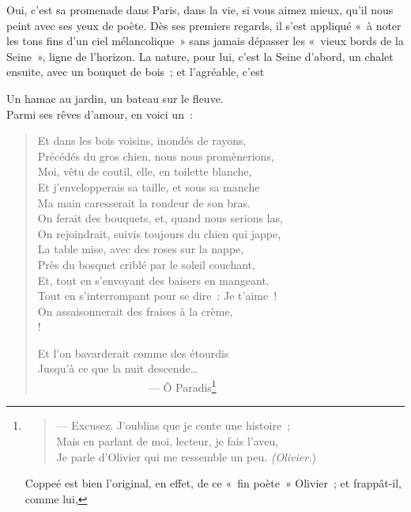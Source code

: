 \documentclass[french,twoside]{book} %
\begin{document}
\noindent Oui, c’est sa promenade dans Paris, dans la vie, si vous aimez mieux, qu’il nous peint avec ses yeux de poète. Dès ses premiers regards, il s’est appliqué « à noter les tons fins d’un ciel mélancolique » sans jamais dépasser les « vieux bords de la Seine », ligne de l’horizon. La nature, pour lui, c’est la Seine d’abord, un chalet ensuite, avec un bouquet de bois ; et l’agréable, c’est\par

Un hamac au jardin, un bateau sur le fleuve.\\

\noindent Parmi ses rêves d’amour, en voici un :\par


\begin{verse}
Et dans les bois voisins, inondés de rayons,\\
Précédés du gros chien, nous nous promènerions,\\
Moi, vêtu de coutil, elle, en toilette blanche,\\
Et j’envelopperais sa taille, et sous sa manche\\
Ma main caresserait la rondeur de son bras.\\
On ferait des bouquets, et, quand nous serions las,\\
On rejoindrait, suivis toujours du chien qui jappe,\\
La table mise, avec des roses sur la nappe,\\
Près du bosquet criblé par le soleil couchant,\\
Et, tout en s’envoyant des baisers en mangeant.\\
Tout en s’interrompant pour se dire : Je t’aime !\\
On assaisonnerait des fraises à la crème,\\!

Et l’on bavarderait comme des étourdis\\
Jusqu’à ce que la nuit descende…\\
                    — Ô Paradis\footnote{
\begin{verse}
— Excusez. J’oublias que je conte une histoire ;\\
Mais en parlant de moi, lecteur, je fais l’aveu,\\
Je parle d’Olivier qui me ressemble un peu. \emph{(Olivier.})\\
\end{verse}
\par
\noindent Coppeé est bien l’original, en effet, de ce « fin poète » Olivier ; et frappât-il, comme lui,\par

}
\end{verse}
\end{document}

